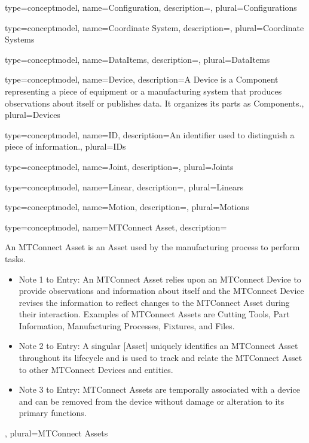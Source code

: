 {
	type={conceptmodel},
    name={Configuration},
	description={},
	plural={Configurations}
}

{
	type={conceptmodel},
    name={Coordinate System},
	description={},
	plural={Coordinate Systems}
}

{
	type={conceptmodel},
    name={DataItems},
	description={},
	plural={DataItems}
}

{
	type={conceptmodel},
    name={Device},
	description={A \gls{Device} is a \gls{Component} representing a piece of equipment or a manufacturing system that produces observations about itself or publishes data. It organizes its parts as \glspl{Component}.},
	plural={Devices}
}

{
	type={conceptmodel},
    name={ID},
	description={An identifier used to distinguish a piece of information.},
	plural={IDs}
}

{
	type={conceptmodel},
    name={Joint},
	description={},
	plural={Joints}
}

{
	type={conceptmodel},
    name={Linear},
	description={},
	plural={Linears}
}

{
	type={conceptmodel},
    name={Motion},
	description={},
	plural={Motions}
}

{
	type={conceptmodel},
    name={MTConnect Asset},
	description={An \gls{MTConnect Asset} is an \gls{Asset} used by the manufacturing process to perform tasks.
\begin{itemize}
    \item Note 1 to Entry: An \gls{MTConnect Asset} relies upon an \gls{MTConnect Device} to provide \glspl{observation} and information about itself and the \gls{MTConnect Device} revises the information to reflect changes to the \gls{MTConnect Asset} during their interaction. Examples of \glspl{MTConnect Asset} are Cutting Tools, Part Information, Manufacturing Processes, Fixtures, and Files.
    \item Note 2 to Entry: A singular [Asset] uniquely identifies an \gls{MTConnect Asset} throughout its lifecycle and is used to track and relate the \gls{MTConnect Asset} to other \glspl{MTConnect Device} and entities.
    \item Note 3 to Entry: \glspl{MTConnect Asset} are temporally associated with a device and can be removed from the device without damage or alteration to its primary functions.
\end{itemize}
},
	plural={MTConnect Assets}
}

